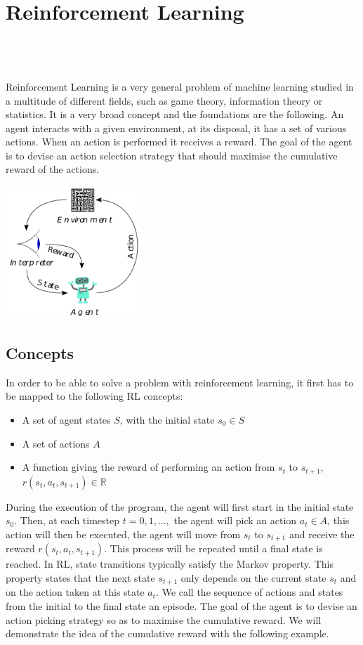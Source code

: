 
\setcounter{chapter}{1}

\chapter{Reinforcement Learning}
\mbox{}\\
\mbox{}\\
\mbox{}\\
Reinforcement Learning\cite{kaelbling1996reinforcement} is a very general problem of machine learning studied in a multitude of different fields, such as game theory, information theory or statistics. It is a very broad concept and the foundations are the following. An agent interacts with a given environment, at its disposal, it has a set of various actions. When an action is performed it receives a reward. The goal of the agent is to devise an action selection strategy that should maximise the cumulative reward of the actions.

\begin{center}
	\includegraphics*[height=5cm]{figures/rl_broad.png}
\end{center}

\section{Concepts}
In order to be able to solve a problem with reinforcement learning, it first has to be mapped to the following RL concepts:
\begin{itemize}
	\item A set of agent states $S$, with the initial state $s_0\in S$
	\item A set of actions $A$
	\item A function giving the reward of performing an action from  $s_t$ to $s_{t+1}$, $r(s_t,a_t,s_{t+1})\in \mathbb{R}$
\end{itemize}
During the execution of the program, the agent will first start in the initial state $s_0$. Then, at each timestep $t=0,1,...,$ the agent will pick an action $a_t \in A$, this action will then be executed, the agent will move from $s_t$ to $s_{t+1}$ and receive the reward $r(s_t,a_t,s_{t+1})$. This process will be repeated until a final state is reached. In RL, state transitions typically satisfy the Markov property. This property states that the next state $s_{t+1}$ only depends on the current state $s_t$ and on the action taken at this state $a_t$. We call the sequence of actions and states from the initial to the final state an episode. The goal of the agent is to devise an action picking strategy so as to maximise the cumulative reward. We will demonstrate the idea of the cumulative reward with the following example.
